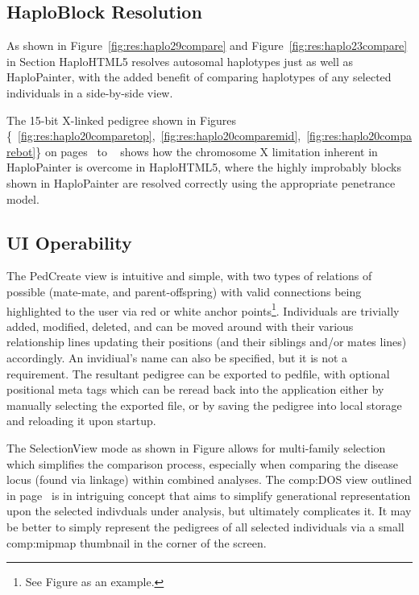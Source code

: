 \subsection{HaploBlock Resolution}
As shown in Figure~\ref{fig:res:haplo29compare} and Figure~\ref{fig:res:haplo23compare} in Section HaploHTML5 resolves autosomal haplotypes just as well as HaploPainter, with the added benefit of comparing haplotypes of any selected individuals in a side-by-side view. 

The 15-bit X-linked pedigree shown in Figures \{~\ref{fig:res:haplo20comparetop},~\ref{fig:res:haplo20comparemid},~\ref{fig:res:haplo20comparebot}\} on pages~\pageref*{fig:res:haplo20comparetop} to ~\pageref*{fig:res:haplo20comparebot} shows how the chromosome X limitation inherent in HaploPainter is overcome in HaploHTML5, where the highly improbably blocks shown in HaploPainter are resolved correctly using the appropriate penetrance model.

\subsection{UI Operability}
The PedCreate view is intuitive and simple, with two types of relations of possible (mate-mate, and parent-offspring) with valid connections being highlighted to the user via red or white anchor points\footnote{See Figure as an example.}. Individuals are trivially added, modified, deleted, and can be moved around with their various relationship lines updating their positions (and their siblings and/or mates lines) accordingly. An invidiual's name can also be specified, but it is not a requirement. The resultant pedigree can be exported to pedfile, with optional positional meta tags which can be reread back into the application either by manually selecting the exported file, or by saving the pedigree into local storage and reloading it upon startup.

The SelectionView mode as shown in Figure allows for multi-family selection which simplifies the comparison process, especially when comparing the disease locus (found via linkage) within combined analyses. The \gls{comp:DOS}\label{ref:disc:dos} view outlined in page~\pageref{ref:haplo:dos} is in intriguing concept that aims to simplify generational representation upon the selected indivduals under analysis, but ultimately complicates it. It may be better to simply represent the pedigrees of all selected individuals via a small \gls{comp:mipmap} thumbnail in the corner of the screen.

